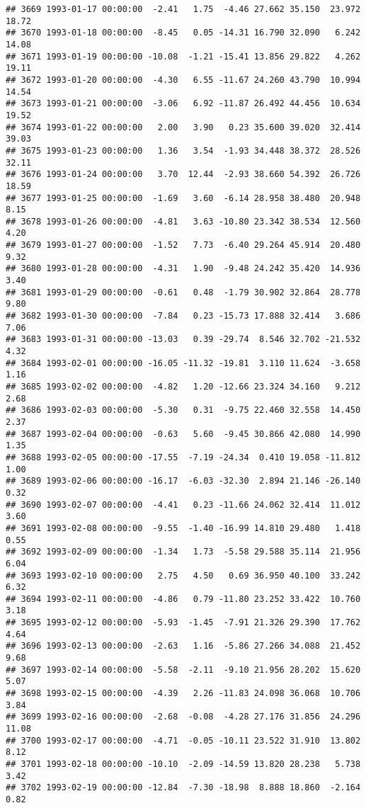 \documentclass{article}\usepackage{graphicx, color}
\makeatletter
\newenvironment{kframe}{%
 \def\at@end@of@kframe{}%
 \ifinner\ifhmode%
  \def\at@end@of@kframe{\end{minipage}}%
  \begin{minipage}{\columnwidth}%
 \fi\fi%
 \def\FrameCommand##1{\hskip\@totalleftmargin \hskip-\fboxsep
 \colorbox{shadecolor}{##1}\hskip-\fboxsep
     \hskip-\linewidth \hskip-\@totalleftmargin \hskip\columnwidth}%
 \MakeFramed {\advance\hsize-\width
   \@totalleftmargin\z@ \linewidth\hsize
   \@setminipage}}%
 {\par\unskip\endMakeFramed%
 \at@end@of@kframe}
\newenvironment{knitrout}{}{} %
\makeatother
\begin{document}
\begin{knitrout}
\begin{kframe}
\begin{verbatim}
## 3669 1993-01-17 00:00:00  -2.41   1.75  -4.46 27.662 35.150  23.972  18.72
## 3670 1993-01-18 00:00:00  -8.45   0.05 -14.31 16.790 32.090   6.242  14.08
## 3671 1993-01-19 00:00:00 -10.08  -1.21 -15.41 13.856 29.822   4.262  19.11
## 3672 1993-01-20 00:00:00  -4.30   6.55 -11.67 24.260 43.790  10.994  14.54
## 3673 1993-01-21 00:00:00  -3.06   6.92 -11.87 26.492 44.456  10.634  19.52
## 3674 1993-01-22 00:00:00   2.00   3.90   0.23 35.600 39.020  32.414  39.03
## 3675 1993-01-23 00:00:00   1.36   3.54  -1.93 34.448 38.372  28.526  32.11
## 3676 1993-01-24 00:00:00   3.70  12.44  -2.93 38.660 54.392  26.726  18.59
## 3677 1993-01-25 00:00:00  -1.69   3.60  -6.14 28.958 38.480  20.948   8.15
## 3678 1993-01-26 00:00:00  -4.81   3.63 -10.80 23.342 38.534  12.560   4.20
## 3679 1993-01-27 00:00:00  -1.52   7.73  -6.40 29.264 45.914  20.480   9.32
## 3680 1993-01-28 00:00:00  -4.31   1.90  -9.48 24.242 35.420  14.936   3.40
## 3681 1993-01-29 00:00:00  -0.61   0.48  -1.79 30.902 32.864  28.778   9.80
## 3682 1993-01-30 00:00:00  -7.84   0.23 -15.73 17.888 32.414   3.686   7.06
## 3683 1993-01-31 00:00:00 -13.03   0.39 -29.74  8.546 32.702 -21.532   4.32
## 3684 1993-02-01 00:00:00 -16.05 -11.32 -19.81  3.110 11.624  -3.658   1.16
## 3685 1993-02-02 00:00:00  -4.82   1.20 -12.66 23.324 34.160   9.212   2.68
## 3686 1993-02-03 00:00:00  -5.30   0.31  -9.75 22.460 32.558  14.450   2.37
## 3687 1993-02-04 00:00:00  -0.63   5.60  -9.45 30.866 42.080  14.990   1.35
## 3688 1993-02-05 00:00:00 -17.55  -7.19 -24.34  0.410 19.058 -11.812   1.00
## 3689 1993-02-06 00:00:00 -16.17  -6.03 -32.30  2.894 21.146 -26.140   0.32
## 3690 1993-02-07 00:00:00  -4.41   0.23 -11.66 24.062 32.414  11.012   3.60
## 3691 1993-02-08 00:00:00  -9.55  -1.40 -16.99 14.810 29.480   1.418   0.55
## 3692 1993-02-09 00:00:00  -1.34   1.73  -5.58 29.588 35.114  21.956   6.04
## 3693 1993-02-10 00:00:00   2.75   4.50   0.69 36.950 40.100  33.242   6.32
## 3694 1993-02-11 00:00:00  -4.86   0.79 -11.80 23.252 33.422  10.760   3.18
## 3695 1993-02-12 00:00:00  -5.93  -1.45  -7.91 21.326 29.390  17.762   4.64
## 3696 1993-02-13 00:00:00  -2.63   1.16  -5.86 27.266 34.088  21.452   9.68
## 3697 1993-02-14 00:00:00  -5.58  -2.11  -9.10 21.956 28.202  15.620   5.07
## 3698 1993-02-15 00:00:00  -4.39   2.26 -11.83 24.098 36.068  10.706   3.84
## 3699 1993-02-16 00:00:00  -2.68  -0.08  -4.28 27.176 31.856  24.296  11.08
## 3700 1993-02-17 00:00:00  -4.71  -0.05 -10.11 23.522 31.910  13.802   8.12
## 3701 1993-02-18 00:00:00 -10.10  -2.09 -14.59 13.820 28.238   5.738   3.42
## 3702 1993-02-19 00:00:00 -12.84  -7.30 -18.98  8.888 18.860  -2.164   0.82

\end{verbatim}
\end{kframe}
\end{knitrout}
\end{document}
